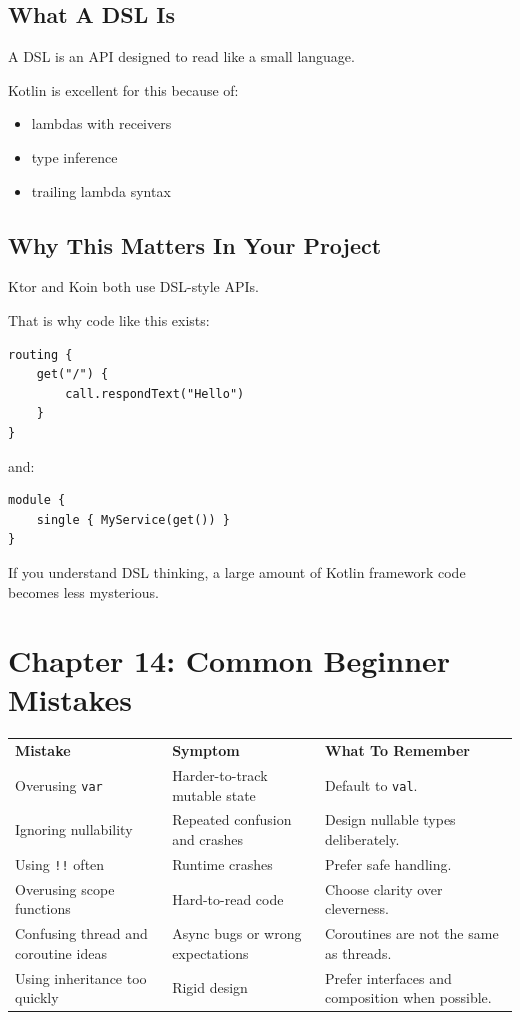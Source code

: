 \documentclass[11pt,a4paper]{article}
\begin{document}
\subsection{What A DSL Is}

A DSL is an API designed to read like a small language.

Kotlin is excellent for this because of:
\begin{itemize}
    \item lambdas with receivers
    \item type inference
    \item trailing lambda syntax
\end{itemize}

\subsection{Why This Matters In Your Project}

Ktor and Koin both use DSL-style APIs.

That is why code like this exists:

\begin{lstlisting}[style=kazekotlin]
routing {
    get("/") {
        call.respondText("Hello")
    }
}
\end{lstlisting}

and:

\begin{lstlisting}[style=kazekotlin]
module {
    single { MyService(get()) }
}
\end{lstlisting}

If you understand DSL thinking, a large amount of Kotlin framework code becomes less mysterious.

\section{Chapter 14: Common Beginner Mistakes}

\begin{longtable}{p{} p{} p{}}
\textbf{Mistake} & \textbf{Symptom} & \textbf{What To Remember} \\
Overusing \texttt{var} & Harder-to-track mutable state & Default to \texttt{val}. \\
Ignoring nullability & Repeated confusion and crashes & Design nullable types deliberately. \\
Using \texttt{!!} often & Runtime crashes & Prefer safe handling. \\
Overusing scope functions & Hard-to-read code & Choose clarity over cleverness. \\
Confusing thread and coroutine ideas & Async bugs or wrong expectations & Coroutines are not the same as threads. \\
Using inheritance too quickly & Rigid design & Prefer interfaces and composition when possible. \\
\end{longtable}
\end{document}
